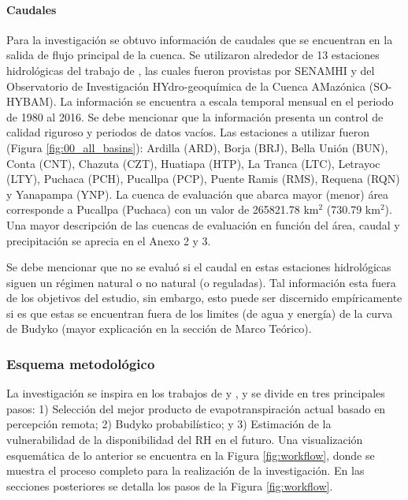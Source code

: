 \documentclass[12pt]{article}
\begin{document}
\paragraph{Caudales}\mbox{}

Para la investigación se obtuvo información de caudales que se encuentran en la salida de flujo principal de la cuenca. Se utilizaron alrededor de 13 estaciones hidrológicas del trabajo de \citet{Aybar2019}, las cuales fueron provistas por SENAMHI y del Observatorio de Investigación HYdro-geoquímica de la Cuenca AMazónica (SO-HYBAM). La información se encuentra a escala temporal mensual en el periodo de 1980 al 2016. Se debe mencionar que la información presenta un control de calidad riguroso y periodos de datos vacíos. Las estaciones a utilizar fueron (Figura \ref{fig:00_all_basins}): Ardilla (ARD), Borja (BRJ), Bella Unión (BUN), Conta (CNT), Chazuta (CZT), Huatiapa (HTP), La Tranca (LTC), Letrayoc (LTY), Puchaca (PCH), Pucallpa (PCP), Puente Ramis (RMS), Requena (RQN) y Yanapampa (YNP). La cuenca de evaluación que abarca mayor (menor) área corresponde a Pucallpa (Puchaca) con un valor de 265821.78 km$^{2}$ (730.79 km$^{2}$). Una mayor descripción de las cuencas de evaluación en función del área, caudal y precipitación se aprecia en el Anexo 2 y 3.

Se debe mencionar que no se evaluó si el caudal en estas estaciones hidrológicas siguen un régimen natural o no natural (o reguladas). Tal información esta fuera de los objetivos del estudio, sin embargo, esto puede ser discernido empíricamente si es que estas se encuentran fuera de los limites (de agua y energía) de la curva de Budyko (mayor explicación en la sección de Marco Teórico).

\clearpage

\clearpage

\clearpage

\subsubsection{Esquema metodológico}

La investigación se inspira en los trabajos de \citet{Weerasinghe2019discuss} y \citet{Singh2015}, y se divide en tres principales pasos: 1) Selección del mejor producto de evapotranspiración actual basado en percepción remota; 2) Budyko probabilístico; y 3) Estimación de la vulnerabilidad de la disponibilidad del RH en el futuro. Una visualización esquemática de lo anterior se encuentra en la Figura \ref{fig:workflow}, donde se muestra el proceso completo para la realización de la investigación. En las secciones posteriores se detalla los pasos de la Figura \ref{fig:workflow}.
\end{document}
